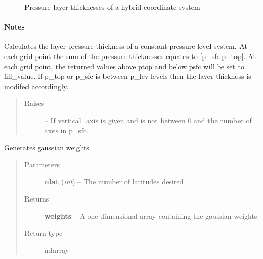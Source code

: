 \documentclass[letterpaper,10pt,english]{sphinxmanual}
\begin{document}
\begin{fulllineitems}

\begin{description}
\item[{{\hyperref[atmos:atmos.util.dpres_hybrid]{}}}] \leavevmode
Pressure layer thicknesses of a hybrid coordinate system

\end{description}


\paragraph{Notes}

Calculates the layer pressure thickness of a constant pressure level
system. At each grid point the sum of the pressure thicknesses equates to
{[}p\_sfc-p\_top{]}. At each grid point, the returned values above ptop and below
psfc will be set to fill\_value. If p\_top or p\_sfc is between p\_lev levels
then the layer thickness is modifed accordingly.
\begin{quote}\begin{description}
\item[{Raises}] \leavevmode
{} --
If vertical\_axis is given and is not between 0 and the number of
axes in p\_sfc.

\end{description}\end{quote}

\end{fulllineitems}


\begin{fulllineitems}
\label{atmos:atmos.util.gaussian_latitude_weights}
Generates gaussian weights.
\begin{quote}\begin{description}
\item[{Parameters}] \leavevmode
\textbf{nlat} (\emph{int}) -- The number of latitudes desired

\item[{Returns}] \leavevmode
\textbf{weights} --
A one-dimensional array containing the gaussian weights.

\item[{Return type}] \leavevmode
ndarray

\end{description}\end{quote}

\end{fulllineitems}
\end{document}
